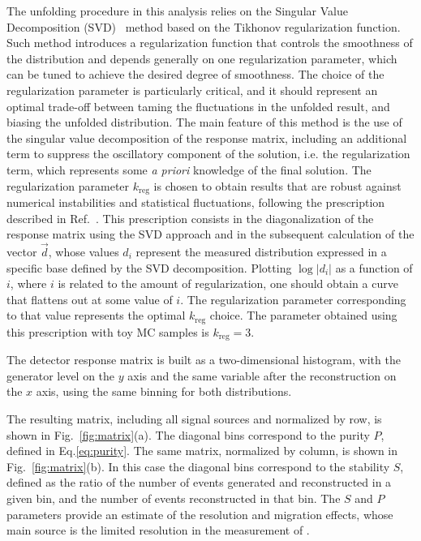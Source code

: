The unfolding procedure in this analysis relies on the Singular Value Decomposition (SVD)~\cite{Hocker:1995kb} method based on the Tikhonov regularization function. Such method introduces a regularization function that controls the smoothness of the distribution and depends generally on one regularization parameter, which can be tuned to achieve the desired degree of smoothness.
The choice of the regularization parameter is particularly critical, and it should represent an optimal trade-off between taming the fluctuations in the unfolded result, and biasing the unfolded distribution.
The main feature of this method is the use of the singular value decomposition of the response matrix, including an additional term to suppress the oscillatory component of the solution, i.e. the regularization term, which represents some \textit{a priori} knowledge of the final solution.
The regularization parameter $k_\mathrm{reg}$ is chosen to obtain results that are robust against numerical instabilities and statistical fluctuations, following the prescription described in Ref.~\cite{Hocker:1995kb}. This prescription consists in the diagonalization of the response matrix using the SVD approach and in the subsequent calculation of the vector $\vec{d}$, whose values $d_i$ represent the measured distribution expressed in a specific base defined by the SVD decomposition. Plotting $\log|d_i|$ as a function of $i$, where $i$ is related to the amount of regularization, one should obtain a curve that flattens out at some value of $i$. The regularization parameter corresponding to that value represents the optimal $k_\mathrm{reg}$ choice. The parameter obtained using this prescription with toy MC samples is $k_\mathrm{reg} = 3$.

The detector response matrix is built as a two-dimensional histogram, with the generator level \pth on the $y$ axis and the same variable after the reconstruction on the $x$ axis, using the same binning for both distributions.

The resulting matrix, including all signal sources and normalized by row, is shown in Fig.~\ref{fig:matrix}(a).
The diagonal bins correspond to the purity $P$, defined in Eq.\eqref{eq:purity}. The same matrix, normalized by column, is shown in Fig.~\ref{fig:matrix}(b). In this case the diagonal bins correspond to the stability $S$, defined as the ratio of the number of events generated and reconstructed in a given bin, and the number of events reconstructed in that bin. The $S$ and $P$ parameters provide an estimate of the \pth resolution and migration effects, whose main source is the limited resolution in the measurement of \MET.

